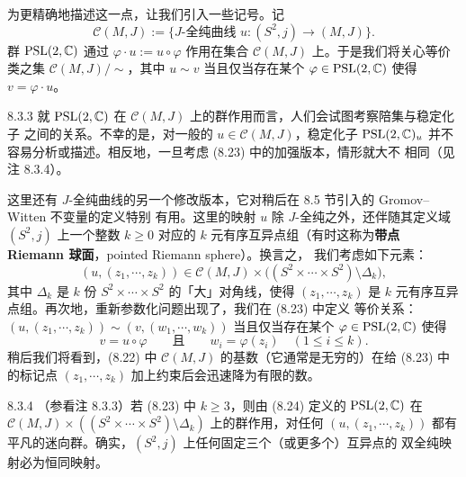 为更精确地描述这一点，让我们引入一些记号。记
\begin{equation}\tag{8.22}
  \mathcal{C}(M,J):=\bigl\{J\text{-全纯曲线 }u\colon(S^2,j)\to(M,J)\bigr\}.
\end{equation}
群 $\mathrm{PSL}(2,\mathbb{C})$ 通过 $\varphi\cdot u:=u\circ\varphi$ 作用在集合
$\mathcal{C}(M,J)$ 上。于是我们将关心等价类之集 $\mathcal{C}(M,J)/\sim$，其中 $u\sim v$
当且仅当存在某个 $\varphi\in\mathrm{PSL}(2,\mathbb{C})$ 使得 $v=\varphi\cdot u$。

\begin{wrem}{8.3.3}
  就 $\mathrm{PSL}(2,\mathbb{C})$ 在 $\mathcal{C}(M,J)$ 上的群作用而言，人们会试图考察陪集与稳定化子
  之间的关系。不幸的是，对一般的 $u\in\mathcal{C}(M,J)$，稳定化子
  $\mathrm{PSL}(2,\mathbb{C})_u$ 并不容易分析或描述。相反地，一旦考虑 (8.23) 中的加强版本，情形就大不
  相同（见注 8.3.4）。
\end{wrem}

这里还有 $J$-全纯曲线的另一个修改版本，它对稍后在 8.5 节引入的 Gromov--Witten 不变量的定义特别
有用。这里的映射 $u$ 除 $J$-全纯之外，还伴随其定义域 $(S^2,j)$ 上一个整数 $k\geqslant0$ 对应的
$k$ 元有序互异点组（有时这称为\textbf{带点 Riemann 球面}，pointed Riemann sphere）。换言之，
我们考虑如下元素：
\begin{equation}\tag{8.23}
  (u,(z_1,\cdots,z_k))\in\mathcal{C}(M,J)\times\bigl((S^2\times\cdots\times S^2)
    \setminus\Delta_k\bigr),
\end{equation}
其中 $\Delta_k$ 是 $k$ 份 $S^2\times\cdots\times S^2$ 的「大」对角线，使得
$(z_1,\cdots,z_k)$ 是 $k$ 元有序互异点组。再次地，重新参数化问题出现了，我们在 (8.23) 中定义
等价关系：$(u,(z_1,\cdots,z_k))\sim(v,(w_1,\cdots,w_k))$ 当且仅当存在某个
$\varphi\in\mathrm{PSL}(2,\mathbb{C})$ 使得
\begin{equation}\tag{8.24}
  v=u\circ\varphi\qquad\text{且}\qquad w_i=\varphi(z_i)\quad(1\leqslant i\leqslant k).
\end{equation}
稍后我们将看到，(8.22) 中 $\mathcal{C}(M,J)$ 的基数（它通常是无穷的）在给 (8.23) 中的标记点
$(z_1,\cdots,z_k)$ 加上约束后会迅速降为有限的数。

\begin{wrem}{8.3.4}
  （参看注 8.3.3）若 (8.23) 中 $k\geqslant3$，则由 (8.24) 定义的 $\mathrm{PSL}(2,\mathbb{C})$ 在
  $\mathcal{C}(M,J)\times((S^2\times\cdots\times S^2)\setminus\Delta_k)$ 上的群作用，对任何
  $(u,(z_1,\cdots,z_k))$ 都有平凡的迷向群。确实，$(S^2,j)$ 上任何固定三个（或更多个）互异点的
  双全纯映射必为恒同映射。
\end{wrem}

